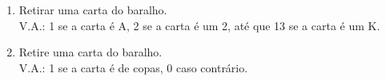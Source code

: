 \documentclass[11pt, a4paper]{article}
\begin{document}
\begin{enumerate}
\begin{enumerate}
	\item  Retirar uma carta do baralho. 
	\\V.A.: 1 se a carta é A, 2 se a carta é um 2, até que 13 se a carta é um K.
	\item Retire uma carta do baralho. 
	\\V.A.: 1 se a carta é de copas, 0 caso contrário.
	
	\end{enumerate}
\end{enumerate}



\end{document}
